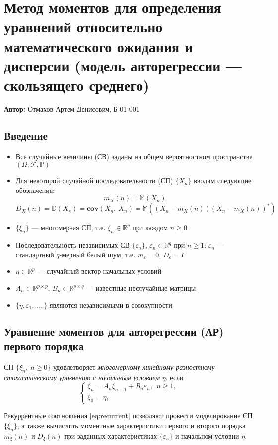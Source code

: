 

\section{Метод моментов для определения уравнений относительно математического ожидания и дисперсии (модель авторегрессии --- скользящего среднего)}

\textbf{Автор:} Отмахов Артем Денисович, Б-01-001

\subsection{Введение}
\begin{itemize}
    \item Все случайные величины (СВ) заданы на общем вероятностном пространстве $(\Omega, \mathscr{F}, \mathbb{P})$
    \item Для некоторой случайной последовательности (СП) $\{X_n\}$ вводим следующие обозначения:
    $$
        m_X(n) = \mathbb{M}(X_n)
    $$
    $$
        D_X(n) = \mathbb{D}(X_n) = \mathbf{cov}(X_n,~X_n) = \mathbb{M}((X_n - m_X(n))(X_n - m_X(n))^*)
    $$
    \item $\{\xi_n\}$ --- многомерная СП, т.е. $\xi_n \in \mathbb{R}^p$ при каждом $n \geq 0$
    \item Последовательность независимых СВ $\{\varepsilon_n\}$, $\varepsilon_n \in \mathbb{R}^q$ при $n \geq 1$: $\varepsilon_n$ --- стандартный $q$-мерный белый шум, т.е. $m_{\varepsilon}=0$, $D_{\varepsilon}=I$
    \item $\eta \in \mathbb{R}^p$ --- случайный вектор начальных условий
    \item $A_n \in \mathbb{R}^{p \times p}$, $B_n \in \mathbb{R}^{p \times q}$ --- известные неслучайные матрицы
    \item $\{\eta, \varepsilon_1, \dots, \}$ являются независимыми в совокупности
\end{itemize}


\subsection{Уравнение моментов для авторегрессии (АР) первого порядка}
\begin{definition} 
	СП $\{\xi_n,~n \geq 0\}$ удовлетворяет \textit{многомерному линейному разностному стохастическому уравнению с начальным условием} $\eta$, если
	\begin{equation}
	    \label{eq:recurrent}
	    \begin{cases}
	        \xi_n = A_n\xi_{n-1} + B_n\varepsilon_n, ~~ n \geq 1,\\
	        \xi_0 = \eta,
	    \end{cases}
	\end{equation}
\end{definition}
Рекуррентные соотношения \eqref{eq:recurrent} позволяют провести моделирование СП $\{\xi_n\}$, а также вычислить моментные характеристики первого и второго порядка $m_{\xi}(n)$ и $D_{\xi}(n)$ при заданных характеристиках $\{\varepsilon_n\}$ и начальном условии $\eta$.
\vspace{1mm}

